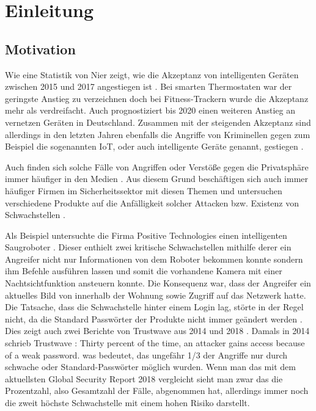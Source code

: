 \chapter{Einleitung}

\section{Motivation}
Wie eine Statistik von Nier zeigt, wie die Akzeptanz von intelligenten Geräten zwischen 2015 und 2017 angestiegen ist \cite{nier_2017}. Bei smarten Thermostaten war der geringste Anstieg zu verzeichnen doch bei Fitness-Trackern wurde die Akzeptanz mehr als verdreifacht. Auch \cite{weitemeyer_2018} prognostiziert bis 2020 einen weiteren Anstieg an vernetzen Geräten in Deutschland.
Zusammen mit der steigenden Akzeptanz sind allerdings in den letzten Jahren ebenfalls die Angriffe von Kriminellen gegen zum Beispiel die sogenannten \ac{IoT}, oder auch intelligente Geräte genannt, gestiegen  \cite{statista_2019}.

Auch finden sich solche Fälle von Angriffen oder Verstöße gegen die Privatsphäre immer häufiger in den Medien \cite{holland_2016} \cite{it_verlag_informationstechnik_gmbh_2018}. Aus diesem Grund beschäftigen sich auch immer häufiger Firmen im Sicherheitssektor mit diesen Themen und untersuchen verschiedene Produkte auf die Anfälligkeit solcher Attacken bzw. Existenz von Schwachstellen \cite{lorenz_2018} \cite{ao_kaspersky_lab_2018}.

Als Beispiel untersuchte die Firma Positive Technologies einen intelligenten Saugroboter \cite{salmi_2017}.
Dieser enthielt zwei kritische Schwachstellen mithilfe derer ein Angreifer nicht nur Informationen von dem Roboter bekommen konnte sondern ihm Befehle ausführen lassen und somit die vorhandene Kamera mit einer Nachtsichtfunktion ansteuern konnte. Die Konsequenz war, dass der Angreifer ein aktuelles Bild von innerhalb der Wohnung sowie Zugriff auf das Netzwerk hatte. Die Tatsache, dass die Schwachstelle hinter einem Login lag, störte in der Regel nicht, da die Standard Passwörter der Produkte nicht immer geändert werden \cite{positive_technologies_2018}.
Dies zeigt auch zwei Berichte von Trustwave aus 2014 und 2018 \cite{trustwave_holdings_inc_2014} \cite{trustwave_holdings_inc_2018}.
Damals in 2014 schrieb Trustwave \cite{trustwave_holdings_inc_2014}: \glqq Thirty percent of the time, an attacker gains access because of a weak password.\grqq{}
was bedeutet, das ungefähr 1/3 der Angriffe nur durch schwache oder Standard-Passwörter möglich wurden. Wenn man das mit dem aktuellsten Global Security Report 2018 vergleicht sieht man zwar das die Prozentzahl, also Gesamtzahl der Fälle, abgenommen hat, allerdings immer noch die zweit höchste Schwachstelle mit einem hohen Risiko darstellt.


